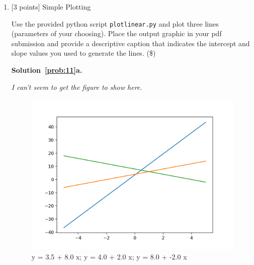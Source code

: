 \documentclass[10pt]{article}
\begin{document}
\begin{enumerate}
{\bf Solution~\ref{prob:10}c.} 

\begin{verbatim}
def exercise10c():
    """
    Vector/matrix manipulation
    :param: none
    :return: void
    """

    np.random.seed(seed=2)
    X = np.asmatrix(np.random.rand(3, 3))
    a = np.random.rand(3, 1)
    b = np.random.rand(3, 1)
    print("a\n {}".format(a))
    print("b\n{}".format(b))
    print("X\n{}".format(X))
    print("aTX\n{}".format(a.transpose() * X))
    print("aTXb\n{}".format(a.transpose() * X * b))
    print("X-1\n{}".format(X.getI()))
    
$ ./hw1.py
a
 [[0.26682728]
 [0.62113383]
 [0.52914209]]
b
[[0.13457995]
 [0.51357812]
 [0.18443987]]
X
[[0.4359949  0.02592623 0.54966248]
 [0.43532239 0.4203678  0.33033482]
 [0.20464863 0.61927097 0.29965467]]
aTX
[[0.495017   0.59570483 0.51040698]]
aTXb
[[0.46669972]]
X-1
[[-1.20936675  5.11771977 -3.42333228]
 [-0.96691719  0.279414    1.46561347]
 [ 2.82418088 -4.07257903  2.64627411]]
\end{verbatim}

\pagebreak

\item \label{prob:11} [3 points] Simple Plotting

Use the provided python script {\tt plotlinear.py} and plot three lines (parameters of your choosing).  Place the output graphic in your pdf submission and provide a descriptive caption that indicates the intercept and slope values you used to generate the lines. (\$)

{\bf Solution~\ref{prob:11}a.} 

\emph{I can't seem to get the figure to show here.}
\begin{figure}

\centering
  \includegraphics[width=\linewidth]{Figure_1.png}
 \caption{y = 3.5 + 8.0 x; y = 4.0 + 2.0 x; y = 8.0 + -2.0 x}
\label{label}


\end{figure}
\end{enumerate}
\end{document}
